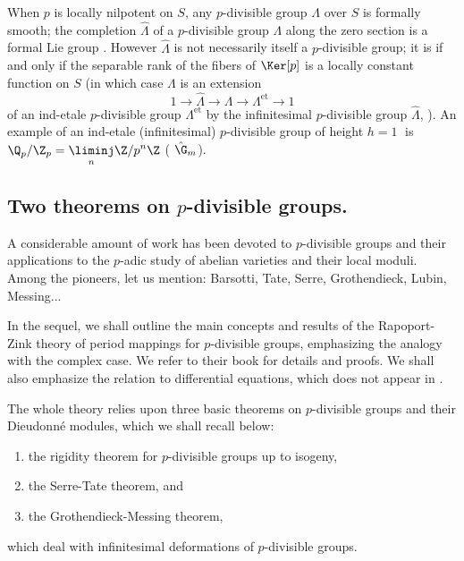 \begin{para}\label{para:2.1.3}
 When $p$ is locally nilpotent on $S$, any $p$-divisible group $\Lambda$
 over $S$ is formally smooth; the completion $\hat\Lambda$ of a
 $p$-divisible group $\Lambda$ along the zero section is a formal Lie
 group \cite[VI,3.1]{grothendieck74:_group_barsot_tate_dieud}.  However
 ${\hat\Lambda}$ is not necessarily 
 itself a $p$-divisible group; it is if and only if the separable rank of
 the fibers of $\Ker[p]$ is a locally constant function on $S$ (in which
 case $\Lambda$ is an extension
 \begin{equation*}
  1\rightarrow \hat{\Lambda}\rightarrow \Lambda\rightarrow
   \Lambda^{\mathrm{et}}\rightarrow 1 
 \end{equation*} 
 of an ind-etale $p$-divisible group $\Lambda^{\mathrm{et}}$ by the
 infinitesimal $p$-divisible group $\hat\Lambda$, \cf
 \cite[III,7.4]{grothendieck74:_group_barsot_tate_dieud}).
 An example of an ind-etale (\resp infinitesimal)
 $p$-divisible group of height $h=1\;$ is
 $\displaystyle {\Q}_p/{\Z}_p=\underset{n}{\liminj} {\Z}/p^n{\Z}$ (\resp
 $\hat {\G}_m$).
\end{para}

\subsection{Two theorems on $p$-divisible groups.}\label{sub:2.2} 

\begin{para}\label{para:2.2.1}
 A considerable amount of work has been
 devoted to $p$-divisible groups and their 
 applications to the $p$-adic study of abelian varieties and their local
 moduli. Among the pioneers, let us mention: Barsotti, Tate, Serre,
 Grothendieck, Lubin, Messing...


 In the sequel, we shall outline the main concepts and results of the
 Rapoport-Zink theory of period mappings for $p$-divisible groups,
 emphasizing the analogy with the complex case. We refer to their book
 \cite{psfpg} for details and proofs. We shall also emphasize the
 relation to differential equations, which does not appear in
 \cite{psfpg}.

 The whole theory relies upon three basic theorems on $p$-divisible
 groups and their Dieudonn\'e modules, which we shall recall below:


 \begin{enumerate}
  \item the rigidity theorem for $p$-divisible groups up to isogeny,
  \item the Serre-Tate theorem, and
  \item the Grothendieck-Messing theorem,
 \end{enumerate}

 \noindent
 which deal with infinitesimal deformations of $p$-divisible groups.
\end{para}

